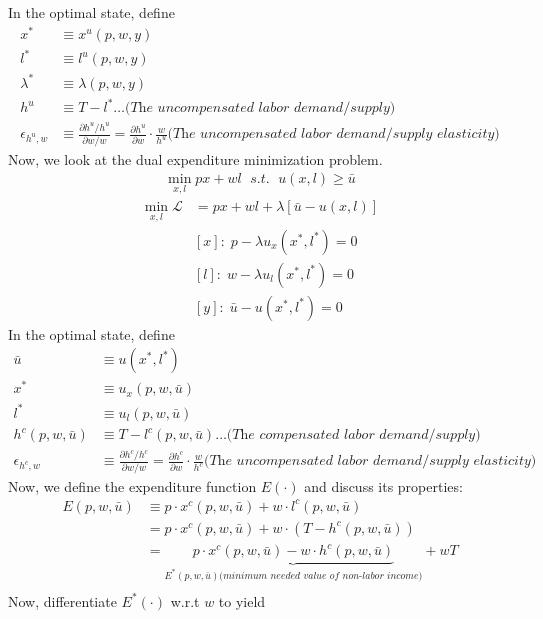 \documentclass[
]{article}
\begin{document}
\begin{enumerate}
In the optimal state, define 
\[\begin{aligned}
x^* &\equiv x^u(p,w,y)\\
l^* &\equiv l^u(p,w,y)\\
\lambda^* &\equiv \lambda(p,w,y)\\
h^u &\equiv T - l^* \dots \textit{(The uncompensated labor demand/supply)}\\
\epsilon_{h^u, w} &\equiv \frac{\partial h^u / h^u}{\partial w / w} = 
\frac{\partial h^u}{\partial w} \cdot \frac{w}{h^u} \textit{(The uncompensated labor demand/supply elasticity)}
\end{aligned}\]  
Now, we look at the dual expenditure minimization problem. 
\[\begin{aligned}
\min_{x, l} px + wl \; \textit{ s.t. } \;u(x, l) \geq \bar{u}
\end{aligned}\]
\[\begin{aligned}
\min_{x, l}\mathcal{L} &= px + wl  + \lambda [\bar{u}-u(x, l) ]\\
&[x]:\; p - \lambda u_x(x^*,l^*) = 0 \\
&[l]:\; w - \lambda u_l(x^*,l^*) = 0 \\
&[y]:\; \bar{u} - u(x^*, l^*) = 0
\end{aligned}\]  
In the optimal state, define 
\[\begin{aligned} 
\bar{u} &\equiv u(x^*, l^*) \\
x^* &\equiv u_x(p,w,\bar{u})\\
l^* &\equiv u_l(p,w,\bar{u})\\
h^c(p,w,\bar{u}) &\equiv T - l^c(p,w,\bar{u}) \dots \textit{(The compensated labor demand/supply)}\\
\epsilon_{h^c, w} &\equiv \frac{\partial h^c / h^c}{\partial w / w} = 
\frac{\partial h^c}{\partial w} \cdot \frac{w}{h^c} \textit{(The uncompensated labor demand/supply elasticity)}
\end{aligned}\]  
Now, we define the expenditure function $E(\cdot)$ and discuss its properties:
\[\begin{aligned}
E(p, w , \bar{u}) &\equiv p \cdot x^c(p,w,\bar{u}) + w\cdot l^c(p, w, \bar{u}) \\
&= p \cdot x^c(p,w,\bar{u}) + w\cdot (T - h^c(p, w, \bar{u})) \\
&=  \underbrace{p \cdot x^c(p,w,\bar{u}) - w\cdot h^c(p, w, \bar{u})}_{E^*(p, w, \bar{u}) \textit{(minimum needed value of non-labor income)}} + wT  \\
\end{aligned}\]
Now, differentiate $E^*(\cdot)$ w.r.t $w$ to yield 

\end{enumerate}
\end{document}
